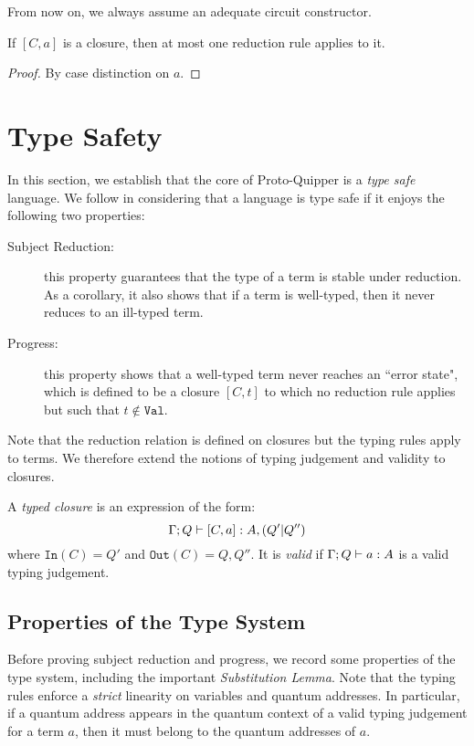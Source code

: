 \documentclass{article}
\begin{document}
From now on, we always assume an adequate circuit constructor.

\begin{proposition}
\label{determinicity}
If $[C,a]$ is a closure, then at most one reduction rule applies
to it.
\end{proposition}

\begin{proof}
By case distinction on $a$.
\end{proof}


\section{Type Safety}

In this section, we establish that the core of  Proto-Quipper 
is a \emph{type safe} language. We follow \cite{WrFe94} in 
considering that a language is type safe if it enjoys the 
following two properties: 
\begin{description}
  \item[Subject Reduction:] this property guarantees 
  that the type of a term is stable under reduction.
  As a corollary, it also shows that if a term is 
  well-typed, then it never reduces to an ill-typed 
  term.
  \item[Progress:] this property shows that a 
  well-typed term never reaches an ``error state", 
  which is defined to be a closure $[C,t]$ to which 
  no reduction rule applies but such that 
  $t\notin \mathtt{Val}$. 
\end{description}
Note that the reduction relation is defined on closures 
but the typing rules apply to terms. We therefore extend 
the notions of typing judgement and validity to closures.

\begin{definition}
A \emph{typed closure} is an expression of the form:
\[
\Gamma;Q\vdash [C,a]:A,(Q'|Q'')
\]
where $\mathtt{In}(C)=Q'$ and $\mathtt{Out}(C)=Q,Q''$. 
It is \emph{valid} if $\Gamma;Q\vdash a:A$ is a valid 
typing judgement.
\end{definition}

\subsection{Properties of the Type System}

Before proving subject reduction and progress, we record 
some properties of the type system, including the important 
\emph{Substitution Lemma}. Note that the typing rules 
enforce a \emph{strict} linearity on variables and quantum 
addresses. In particular, if a quantum address appears in 
the quantum context of a valid typing judgement for a term 
$a$, then it must belong to the quantum addresses of $a$.
\end{document}
